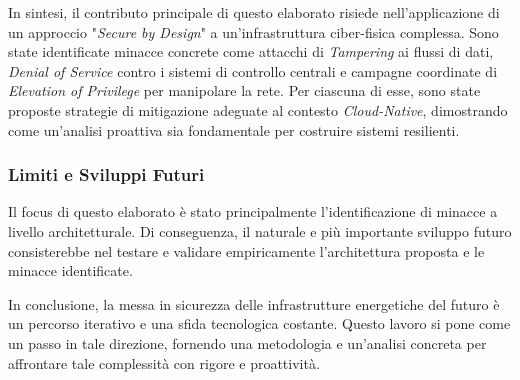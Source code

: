 In sintesi, il contributo principale di questo elaborato risiede nell'applicazione di un approccio "\textit{Secure by Design}" a un'infrastruttura ciber-fisica complessa. Sono state identificate minacce concrete come attacchi di \textit{Tampering} ai flussi di dati, \textit{Denial of Service} contro i sistemi di controllo centrali e campagne coordinate di \textit{Elevation of Privilege} per manipolare la rete. Per ciascuna di esse, sono state proposte strategie di mitigazione adeguate al contesto \textit{Cloud-Native}, dimostrando come un'analisi proattiva sia fondamentale per costruire sistemi resilienti.


\subsubsection{Limiti e Sviluppi Futuri}

Il focus di questo elaborato è stato principalmente l'identificazione di minacce a livello architetturale. Di conseguenza, il naturale e più importante sviluppo futuro consisterebbe nel testare e validare empiricamente l'architettura proposta e le minacce identificate.


In conclusione, la messa in sicurezza delle infrastrutture energetiche del futuro è un percorso iterativo e una sfida tecnologica costante. Questo lavoro si pone come un passo in tale direzione, fornendo una metodologia e un'analisi concreta per affrontare tale complessità con rigore e proattività.